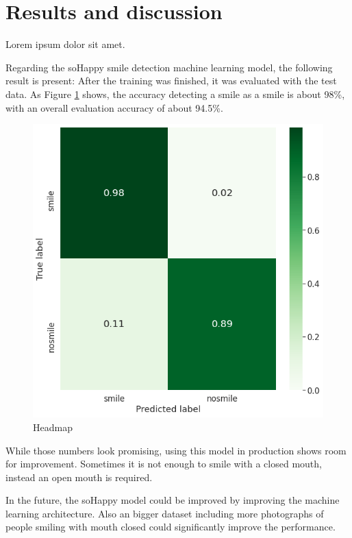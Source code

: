 \section{Results and discussion} \label{sec:results_and_discussion}
Lorem ipsum dolor sit amet.


Regarding the soHappy smile detection machine learning model, the following
result is present: After the training was finished, it was evaluated with the
test data. As Figure \ref{fig:training_result} shows, the accuracy detecting a
smile as a smile is about 98\%, with an overall evaluation accuracy of about 
94.5\%.

\begin{figure}
  \includegraphics[width=\linewidth]{figures/training_result.png}
  \caption{Headmap }
  \label{fig:training_result}
\end{figure}

While those numbers look promising, using this model in production shows
room for improvement. Sometimes it is not enough to smile with a closed
mouth, instead an open mouth is required.

In the future, the soHappy model could be improved by improving the machine 
learning architecture. Also an bigger dataset including more photographs of
people smiling with mouth closed could significantly improve the performance.